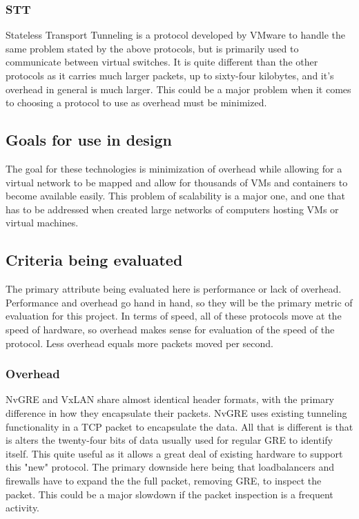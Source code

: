 \documentclass[10pt,letterpaper,onecolumn,draftclsnofoot]{IEEEtran}
\begin{document}
\subsubsection{STT}
Stateless Transport Tunneling is a protocol developed by VMware to handle the
same problem stated by the above protocols, but is primarily used to communicate
between virtual switches. It is quite different than the other protocols as it
carries much larger packets, up to sixty-four kilobytes, and it's overhead in
general is much larger. This could be a major problem when it comes to choosing
a protocol to use as overhead must be minimized.

\subsection{Goals for use in design}
The goal for these technologies is minimization of overhead while allowing for a
virtual network to be mapped and allow for thousands of VMs and containers to
become available easily. This problem of scalability is a major one, and one
that has to be addressed when created large networks of computers hosting VMs or
virtual machines.

\subsection{Criteria being evaluated}
The primary attribute being evaluated here is performance or lack of overhead.
Performance and overhead go hand in hand, so they will be the primary metric of
evaluation for this project. In terms of speed, all of these protocols move at
the speed of hardware, so overhead makes sense for evaluation of the speed of
the protocol. Less overhead equals more packets moved per second.

\subsubsection{Overhead}
NvGRE and VxLAN share almost identical header formats, with the primary
difference in how they encapsulate their packets. NvGRE uses existing tunneling
functionality in a TCP packet to encapsulate the data. All that is different is
that is alters the twenty-four bits of data usually used for regular GRE to
identify itself. This quite useful as it allows a great deal of existing
hardware to support this "new" protocol. The primary downside here being that
loadbalancers and firewalls have to expand the the full packet, removing GRE, to
inspect the packet. This could be a major slowdown if the packet inspection is a
frequent activity.\cite{nvgre-vs-vxlan}
\end{document}
